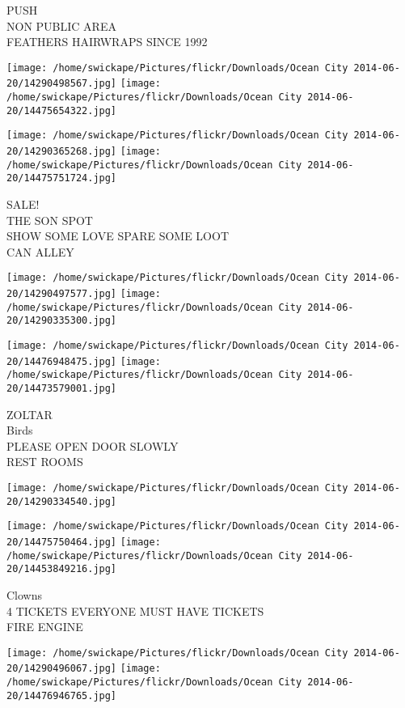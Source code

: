 \documentclass[10pt,letterpaper]{article}
\begin{document}
PUSH\\
NON PUBLIC AREA\\
FEATHERS HAIRWRAPS SINCE 1992\\
\pagebreak

\texttt{[image: /home/swickape/Pictures/flickr/Downloads/Ocean City 2014-06-20/14290498567.jpg]}
\texttt{[image: /home/swickape/Pictures/flickr/Downloads/Ocean City 2014-06-20/14475654322.jpg]}

\texttt{[image: /home/swickape/Pictures/flickr/Downloads/Ocean City 2014-06-20/14290365268.jpg]}
\texttt{[image: /home/swickape/Pictures/flickr/Downloads/Ocean City 2014-06-20/14475751724.jpg]}

SALE!\\
THE SON SPOT\\
SHOW SOME LOVE SPARE SOME LOOT\\
CAN ALLEY\\
\pagebreak

\texttt{[image: /home/swickape/Pictures/flickr/Downloads/Ocean City 2014-06-20/14290497577.jpg]}
\texttt{[image: /home/swickape/Pictures/flickr/Downloads/Ocean City 2014-06-20/14290335300.jpg]}

\texttt{[image: /home/swickape/Pictures/flickr/Downloads/Ocean City 2014-06-20/14476948475.jpg]}
\texttt{[image: /home/swickape/Pictures/flickr/Downloads/Ocean City 2014-06-20/14473579001.jpg]}

ZOLTAR\\
Birds\\
PLEASE OPEN DOOR SLOWLY\\
REST ROOMS\\
\pagebreak

\texttt{[image: /home/swickape/Pictures/flickr/Downloads/Ocean City 2014-06-20/14290334540.jpg]}

\vspace{0.25in}
\texttt{[image: /home/swickape/Pictures/flickr/Downloads/Ocean City 2014-06-20/14475750464.jpg]}
\texttt{[image: /home/swickape/Pictures/flickr/Downloads/Ocean City 2014-06-20/14453849216.jpg]}

Clowns\\
4 TICKETS EVERYONE MUST HAVE TICKETS\\
FIRE ENGINE\\
\pagebreak

\texttt{[image: /home/swickape/Pictures/flickr/Downloads/Ocean City 2014-06-20/14290496067.jpg]}
\texttt{[image: /home/swickape/Pictures/flickr/Downloads/Ocean City 2014-06-20/14476946765.jpg]}
\end{document}
